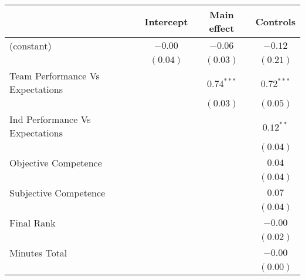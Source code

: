 
\begin{table}
\begin{center}
\begin{tabular}{l c c c }
\toprule
 & Intercept & Main effect & Controls \\
\midrule
(constant)                                                        & $-0.00$  & $-0.06$               & $-0.12$               \\
                                                                  & $(0.04)$ & $(0.03)$              & $(0.21)$              \\
Team Performance Vs Expectations                                  &          & $\mathbf{0.74}^{***}$ & $\mathbf{0.72}^{***}$ \\
                                                                  &          & $(0.03)$              & $(0.05)$              \\
Ind Performance Vs Expectations                                   &          &                       & $\mathbf{0.12}^{**}$  \\
                                                                  &          &                       & $(0.04)$              \\
Objective Competence                                              &          &                       & $0.04$                \\
                                                                  &          &                       & $(0.04)$              \\
Subjective Competence                                             &          &                       & $0.07$                \\
                                                                  &          &                       & $(0.04)$              \\
Final Rank                                                        &          &                       & $-0.00$               \\
                                                                  &          &                       & $(0.02)$              \\
Minutes Total                                                     &          &                       & $-0.00$               \\
                                                                  &          &                       & $(0.00)$              \\

\end{tabular}
\end{center}
\end{table}
